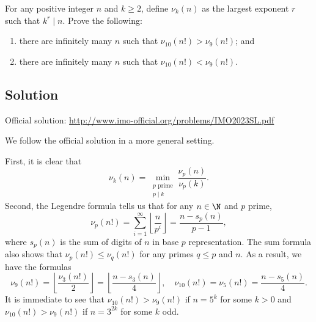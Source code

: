 For any positive integer $n$ and $k \geq 2$, define $\nu_k(n)$ as the largest exponent $r$ such that $k^r \mid n$.
Prove the following:
\begin{enumerate}
    \item   there are infinitely many $n$ such that $\nu_{10}(n!) > \nu_9(n!)$; and
    \item   there are infinitely many $n$ such that $\nu_{10}(n!) < \nu_9(n!)$.
\end{enumerate}



\subsection*{Solution}

Official solution: \url{http://www.imo-official.org/problems/IMO2023SL.pdf}

We follow the official solution in a more general setting.

First, it is clear that
\[ \nu_k(n) = \min_{\substack{p \text{ prime} \\ p \mid k}} \frac{\nu_p(n)}{\nu_p(k)}. \]
Second, the Legendre formula tells us that for any $n \in \N$ and $p$ prime,
\[ \nu_p(n!) = \sum_{i = 1}^{\infty} \left\lfloor \frac{n}{p^i} \right\rfloor = \frac{n - s_p(n)}{p - 1}, \]
    where $s_p(n)$ is the sum of digits of $n$ in base $p$ representation.
The sum formula also shows that $\nu_p(n!) \leq \nu_q(n!)$ for any primes $q \leq p$ and $n$.
As a result, we have the formulas
\[ \nu_9(n!) = \left\lfloor\frac{\nu_3(n!)}{2}\right\rfloor = \left\lfloor\frac{n - s_3(n)}{4}\right\rfloor, \quad \nu_{10}(n!) = \nu_5(n!) = \frac{n - s_5(n)}{4}. \]
It is immediate to see that $\nu_{10}(n!) > \nu_9(n!)$ if $n = 5^k$ for some $k > 0$ and $\nu_{10}(n!) > \nu_9(n!)$ if $n = 3^{2k}$ for some $k$ odd.
